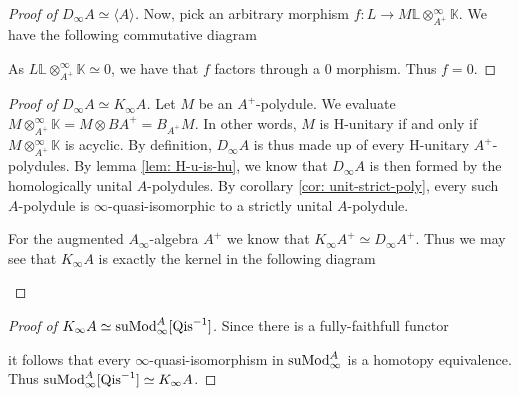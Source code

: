 \documentclass[../thesis.tex]{subfiles}
\begin{document}
\begin{proof}[Proof of $D_\infty A \simeq \langle A \rangle$]
                Now, pick an arbitrary morphism $f : L \rightarrow M \mathbb{L}\otimes_{A^+}^\infty \mathbb{K}$. We have the following commutative diagram
                \begin{center}
                \end{center}

                As $L \mathbb{L}\otimes_{A^+}^\infty \mathbb{K} \simeq 0$, we have that $f$ factors through a $0$ morphism. Thus $f = 0$.
            \end{proof}

            \begin{proof}[Proof of $D_\infty A \simeq K_\infty A$]
                Let $M$ be an $A^+$-polydule. We evaluate $M \otimes_{A^+}^\infty \mathbb{K} = M \otimes BA^+ = B_{A^+}M$. In other words, $M$ is H-unitary if and only if $M \otimes_{A^+}^\infty \mathbb{K}$ is acyclic. By definition, $D_\infty A$ is thus made up of every H-unitary $A^+$-polydules. By lemma \ref{lem: H-u-is-hu}, we know that $D_\infty A$ is then formed by the homologically unital $A$-polydules. By corollary \ref{cor: unit-strict-poly}, every such $A$-polydule is $\infty$-quasi-isomorphic to a strictly unital $A$-polydule.

                For the augmented $A_\infty$-algebra $A^+$ we know that $K_\infty A^+ \simeq D_\infty A^+$. Thus we may see that $K_\infty A$ is exactly the kernel in the following diagram
                \begin{center}
                \end{center}
            \end{proof}

            \begin{proof}[Proof of $K_\infty A \simeq \tt{suMod}_\infty^A{[\tt{Qis}^{-1}]}$]
                Since there is a fully-faithfull functor
                \begin{center}
                \end{center}
                it follows that every $\infty$-quasi-isomorphism in $\tt{suMod}_\infty^A$ is a homotopy equivalence. Thus $\tt{suMod}_\infty^A[\tt{Qis}^{-1}]\simeq K_\infty A$.
            \end{proof}
\end{document}
